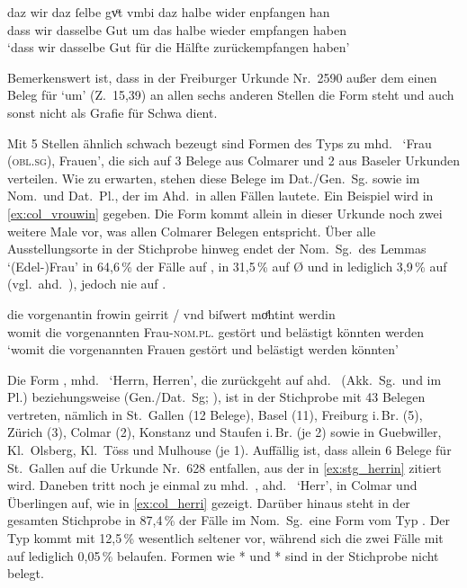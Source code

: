 \begin{exe}
\ex\label{ex:col_umbi}
	\gll daz wir {daz ſelbe} gvͦt vmbi daz halbe wider enpfangen han \\
		dass wir dasselbe Gut um das halbe wieder empfangen haben \\
	\trans `dass wir dasselbe Gut für die Hälfte  zurückempfangen haben'
		\parencites(Nr.~N~92, Colmar, 1269)[64,27--28]{cao5}
\end{exe}

Bemerkenswert ist, dass in der Freiburger Urkunde Nr.~2590
\autocite[15,32--16,4]{cao4} außer dem einen Beleg für  `um'
(Z.~15,39) an allen sechs anderen Stellen die Form  steht und 
auch sonst nicht als Grafie für Schwa dient.

Mit 5 Stellen ähnlich schwach bezeugt sind Formen des Typs  zu
mhd.~ `Frau (\textsc{obl.sg}), Frauen', die sich auf 3 Belege aus
Colmarer und 2 aus Baseler Urkunden verteilen. Wie zu erwarten, stehen diese
Belege im Dat./Gen.~Sg. sowie im Nom.\ und Dat.~Pl., der im Ahd.\ in allen
Fällen  lautete. Ein Beispiel wird in \cref{ex:col_vrouwin}
gegeben. Die Form kommt allein in dieser Urkunde noch zwei weitere Male vor,
was allen Colmarer Belegen entspricht. Über alle Ausstellungsorte in der
Stichprobe hinweg endet der Nom.~Sg.\ des Lemmas  `(Edel-)Frau' in
64,6\,\% der Fälle auf , in 31,5\,\% auf Ø und in lediglich 3,9\,\% auf
 (vgl.~ahd.~), jedoch nie auf .

\begin{exe}
\ex\label{ex:col_vrouwin}
	 die vorgenantin frowin geirrit / vnd biſwert moͤhtint
			werdin \\
		womit die vorgenannten Frau-\textsc{nom.pl.\FemF} gestört {} und
			belästigt könnten werden \\
	\trans `womit die vorgenannten Frauen gestört und belästigt werden
		könnten'
		\parencites(Nr.~3293, Colmar, 1299)[446,24]{cao4}
\end{exe}

Die Form , mhd.~ `Herrn, Herren', die zurückgeht auf
ahd.~ (Akk.~Sg.\ und im Pl.) beziehungsweise
 (Gen./Dat.~Sg; \cite[vgl.][282--283]{braune2018}), ist in der
Stichprobe mit 43 Belegen vertreten, nämlich in St.~Gallen (12 Belege), Basel
(11), Freiburg i.\,Br. (5), Zürich (3), Colmar (2), Konstanz und Staufen
i.\,Br. (je 2) sowie in Guebwiller, Kl.~Olsberg, Kl.~Töss und Mulhouse (je 1).
Auffällig ist, dass allein 6 Belege für St.~Gallen auf die Urkunde Nr.~628
\autocite[55,35--57,7]{cao2} entfallen, aus der in \cref{ex:stg_herrin} zitiert
wird. Daneben tritt noch je einmal  zu mhd.~,
ahd.~ `Herr', in Colmar und Überlingen auf, wie in
\cref{ex:col_herri} gezeigt. Darüber hinaus steht in der gesamten Stichprobe in
87,4\,\% der Fälle im Nom.~Sg.\ eine Form vom Typ . Der Typ
 kommt mit 12,5\,\% wesentlich seltener vor, während sich die zwei
Fälle mit  auf lediglich 0,05\,\% belaufen. Formen wie *
und * sind in der Stichprobe nicht belegt.

